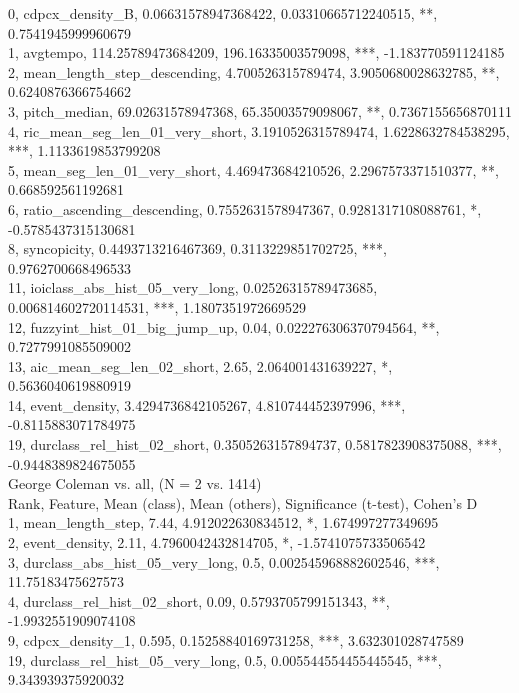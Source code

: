 0, cdpcx_density_B, 0.06631578947368422, 0.03310665712240515, **, 0.7541945999960679\\
1, avgtempo, 114.25789473684209, 196.16335003579098, ***, -1.183770591124185\\
2, mean_length_step_descending, 4.700526315789474, 3.9050680028632785, **, 0.6240876366754662\\
3, pitch_median, 69.02631578947368, 65.35003579098067, **, 0.7367155656870111\\
4, ric_mean_seg_len_01_very_short, 3.1910526315789474, 1.6228632784538295, ***, 1.1133619853799208\\
5, mean_seg_len_01_very_short, 4.469473684210526, 2.2967573371510377, **, 0.668592561192681\\
6, ratio_ascending_descending, 0.7552631578947367, 0.9281317108088761, *, -0.5785437315130681\\
8, syncopicity, 0.4493713216467369, 0.3113229851702725, ***, 0.9762700668496533\\
11, ioiclass_abs_hist_05_very_long, 0.02526315789473685, 0.006814602720114531, ***, 1.1807351972669529\\
12, fuzzyint_hist_01_big_jump_up, 0.04, 0.022276306370794564, **, 0.7277991085509002\\
13, aic_mean_seg_len_02_short, 2.65, 2.064001431639227, *, 0.5636040619880919\\
14, event_density, 3.4294736842105267, 4.810744452397996, ***, -0.8115883071784975\\
19, durclass_rel_hist_02_short, 0.3505263157894737, 0.5817823908375088, ***, -0.9448389824675055\\
George Coleman vs. all, (N = 2 vs. 1414)\\
Rank, Feature, Mean (class), Mean (others), Significance (t-test), Cohen's D\\
1, mean_length_step, 7.44, 4.912022630834512, *, 1.674997277349695\\
2, event_density, 2.11, 4.7960042432814705, *, -1.5741075733506542\\
3, durclass_abs_hist_05_very_long, 0.5, 0.002545968882602546, ***, 11.75183475627573\\
4, durclass_rel_hist_02_short, 0.09, 0.5793705799151343, **, -1.9932551909074108\\
9, cdpcx_density_1, 0.595, 0.15258840169731258, ***, 3.632301028747589\\
19, durclass_rel_hist_05_very_long, 0.5, 0.005544554455445545, ***, 9.343939375920032\\
